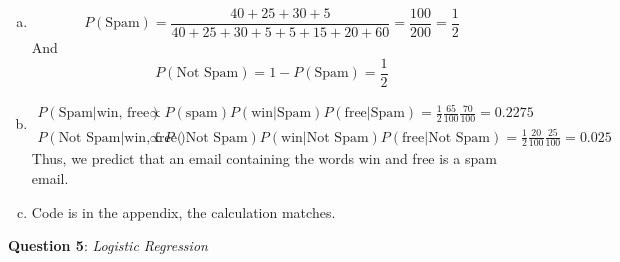 \documentclass{article} %
\newcommand{\question}[2][]{
  \begin{flushleft}
    \textbf{Question #1}: \textit{#2}

\end{flushleft}}
\begin{document}
\begin{enumerate}[(a)]
  \item
    \[
      P(\text{Spam}) = \frac{40 + 25 + 30 + 5}{40 + 25 + 30 + 5 + 5 +
      15 + 20 + 60} = \frac{100}{200} = \frac{1}{2}
    \]
    And
    \[
      P(\text{Not Spam}) = 1 - P(\text{Spam}) = \frac{1}{2}
    \]
  \item
    \begin{align*}
      P(\text{Spam}|\text{win, free}) &\propto
      P(\text{spam})P(\text{win}|\text{Spam})P(\text{free}|\text{Spam})
      = \frac{1}{2}\frac{65}{100}\frac{70}{100} = 0.2275\\
      P(\text{Not Spam}|\text{win, free}) &\propto
      P(\text{Not Spam})P(\text{win}|\text{Not
      Spam})P(\text{free}|\text{Not Spam})
      = \frac{1}{2}\frac{20}{100}\frac{25}{100} = 0.025
    \end{align*}
    Thus, we predict that an email containing the words win and free
    is a spam email.
  \item Code is in the appendix, the calculation matches.
\end{enumerate}
\question[5]{Logistic Regression}
\end{document}
